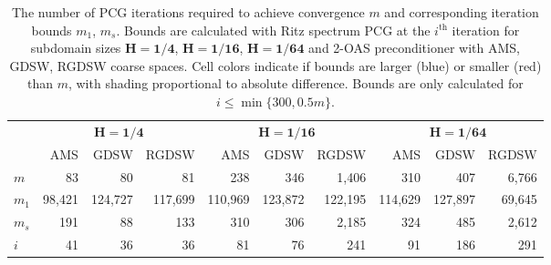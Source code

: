 \begin{table}[H]
\centering
\caption{The number of PCG iterations required to achieve convergence $m$ and corresponding iteration bounds $m_1$, $m_s$. Bounds are calculated with Ritz spectrum PCG at the $i^{\textrm{th}}$ iteration for subdomain sizes $\mathbf{H=1/4}$, $\mathbf{H=1/16}$, $\mathbf{H=1/64}$ and 2-OAS preconditioner with AMS, GDSW, RGDSW coarse spaces. Cell colors indicate if bounds are larger (blue) or smaller (red) than $m$, with shading proportional to absolute difference. Bounds are only calculated for $i \leq \min\{300, 0.5m\}$.}
\label{tab:cg_iteration_bounds}
\begin{tabular}{lrrrrrrrrr}
\toprule
 & \multicolumn{3}{c}{$\mathbf{H=1/4}$} & \multicolumn{3}{c}{$\mathbf{H=1/16}$} & \multicolumn{3}{c}{$\mathbf{H=1/64}$} \\
 & AMS & GDSW & RGDSW & AMS & GDSW & RGDSW & AMS & GDSW & RGDSW \\
\midrule
$m$ & 83 & 80 & 81 & 238 & 346 & 1,406 & 310 & 407 & 6,766 \\
\cline{1-10}
$m_1$ & {\cellcolor[HTML]{AFC9F6}} \color[HTML]{000000} 98,421 & {\cellcolor[HTML]{AFC9F6}} \color[HTML]{000000} 124,727 & {\cellcolor[HTML]{AFC9F6}} \color[HTML]{000000} 117,699 & {\cellcolor[HTML]{AFC9F6}} \color[HTML]{000000} 110,969 & {\cellcolor[HTML]{7EAFF1}} \color[HTML]{000000} 123,872 & {\cellcolor[HTML]{AFC9F6}} \color[HTML]{000000} 122,195 & {\cellcolor[HTML]{AFC9F6}} \color[HTML]{000000} 114,629 & {\cellcolor[HTML]{AFC9F6}} \color[HTML]{000000} 127,897 & {\cellcolor[HTML]{7EAFF1}} \color[HTML]{000000} 69,645 \\
\cline{1-10}
$m_s$ & {\cellcolor[HTML]{7EAFF1}} \color[HTML]{000000} 191 & {\cellcolor[HTML]{7EAFF1}} \color[HTML]{000000} 88 & {\cellcolor[HTML]{7EAFF1}} \color[HTML]{000000} 133 & {\cellcolor[HTML]{7EAFF1}} \color[HTML]{000000} 310 & {\cellcolor[HTML]{945357}} \color[HTML]{F1F1F1} 306 & {\cellcolor[HTML]{7EAFF1}} \color[HTML]{000000} 2,185 & {\cellcolor[HTML]{7EAFF1}} \color[HTML]{000000} 324 & {\cellcolor[HTML]{7EAFF1}} \color[HTML]{000000} 485 & {\cellcolor[HTML]{945357}} \color[HTML]{F1F1F1} 2,612 \\
\cline{1-10}
$i$ & 41 & 36 & 36 & 81 & 76 & 241 & 91 & 186 & 291 \\
\cline{1-10}
\bottomrule
\end{tabular}
\end{table}
